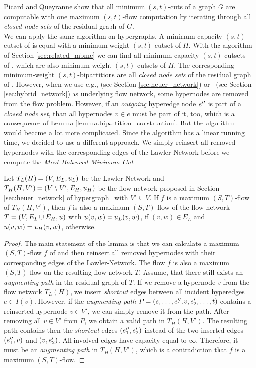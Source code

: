 Picard and Queyranne \cite{picard1980structure} show that all minimum $(s,t)$-cuts 
of a graph $G$ are computable with one maximum $(s,t)$-flow computation by 
iterating through all \emph{closed node sets} of the residual graph of $G$. \\
We can apply the same algorithm on hypergraphs. A minimum-capacity $(s,t)$-cutset of 
is equal with a minimum-weight $(s,t)$-cutset of $H$. With the algorithm
of Section \ref{sec:related_mbmc} we can find all minimum-capacity
$(s,t)$-cutsets of , which are also minimum-weight $(s,t)$-cutsets
of $H$. The corresponding minimum-weight $(s,t)$-bipartitions are all
\emph{closed node sets} of the residual graph of . 
However, when we use e.g.,  (see Section \ref{sec:heuer_network})
or \ShortHybrid~(see Section \ref{sec:hybrid_network}) as underlying flow network,
some hypernodes are removed from the flow problem. However, if an
\emph{outgoing} hyperedge node $e''$ is part of a \emph{closed node set}, than
all hypernodes $v \in e$ must be part of it, too, which is a consequence of Lemma \ref{lemma:bipartition_construction}. 
But the algorithm would become a lot more complicated. Since the algorithm has 
a linear running time, we decided to use a different approach. We simply reinsert all
removed hypernodes with the corresponding edges of the Lawler-Network before we compute 
the \emph{Most Balanced Minimum Cut}. 
\begin{lemma}
Let $T_L(H) = (V,E_L,u_L)$ be the Lawler-Network and $T_H(H,V') = (V \setminus V', E_H, u_H)$ be the
flow network proposed in Section \ref{sec:heuer_network} of hypergraph \HypergraphDef~with $V' \subseteq V$.
If $f$ is a maximum $(S,T)$-flow of $T_H(H,V')$, then $f$ is also a maximum $(S,T)$-flow of the
flow network $T = (V, E_L \cup E_H, u)$ with $u(v,w) = u_L(v,w)$, if
$(v,w) \in E_L$ and $u(v,w) = u_H(v,w)$, otherwise.
\end{lemma}
\begin{proof}
The main statement of the lemma is that we can calculate a maximum $(S,T)$-flow $f$ of 
 and then reinsert all removed hypernodes with their corresponding edges of the Lawler-Network.
The flow $f$ is also a maximum $(S,T)$-flow on the resulting flow network $T$.
Assume, that there still exists an \emph{augmenting path} in the residual graph of $T$.
If we remove a hypernode $v$ from the flow network $T_L(H)$, we insert \emph{shortcut} edges
between all incident hyperedges $e \in I(v)$. However, if the \emph{augmenting path} $P = (s,\ldots,e_1'',v,e_2',\ldots,t)$
contains a reinserted hypernode $v \in V'$, we can simply remove it from the path. 
After removing all $v \in V'$ from $P$, we obtain a valid path in $T_H(H,V')$. 
The resulting path contains then the \emph{shortcut} edges $(e_1'',e_2')$
instead of the two inserted edges $(e_1'',v)$ and $(v,e_2')$. All involved edges
have capacity equal to $\infty$. Therefore, it must be an \emph{augmenting path} in $T_H(H,V')$, 
which is a contradiction that $f$ is a maximum $(S,T)$-flow.
\end{proof}

